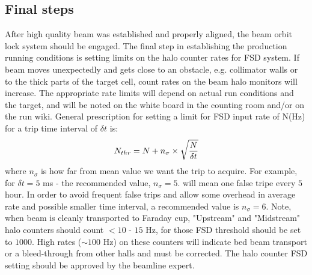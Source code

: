 \subsection{Final steps}\label{sec:final_steps} 
After high quality beam was established and properly aligned, the beam orbit lock system should be engaged. %
The final step in establishing the production running conditions is setting 
limits on the halo counter rates for FSD system. If beam moves unexpectedly and gets close to an obstacle, e.g. collimator walls or to the thick parts of the target cell, count rates on the beam halo monitors  will increase. The appropriate rate limits will depend on actual run conditions and the target, and will be noted on the white board in the counting room and/or on the run wiki. General prescription for setting a limit for FSD input rate of N(Hz) for a trip time interval of $\delta t$ is:
\begin{eqnarray*}
N_{thr}=N+n_\sigma\times\sqrt{N\over{\delta t}}
\end{eqnarray*}
where $n_\sigma$ is how far from mean value we want the trip to acquire. For example, for $\delta t=5$ ms - the recommended value, $n_\sigma=5.$ will mean one false tripe every $5$ hour. In order to avoid frequent false trips and allow some overhead in average rate and possible smaller time interval, a recommended value is $n_\sigma=6$. Note, when beam is cleanly transported to Faraday cup, "Upstream" and "Midstream" halo counters should count $<10$ - $15$ Hz, for those FSD threshold should be set to $1000$. High rates ($\sim 100$ Hz) on these counters will indicate bed beam transport or a bleed-through from other halls and must be corrected. 
The halo counter FSD setting should be approved by the beamline expert.

